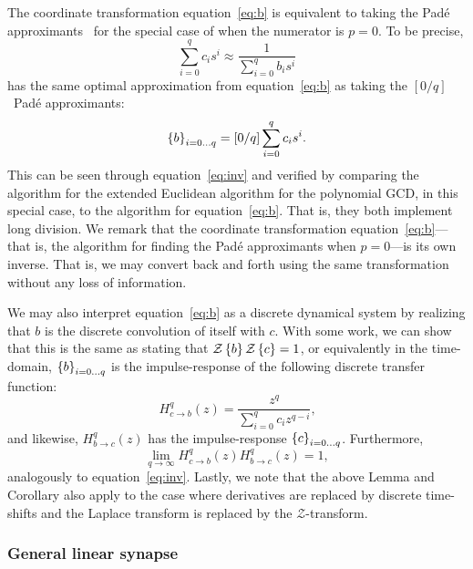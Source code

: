 The coordinate transformation equation~\ref{eq:b} is equivalent to taking the Pad\'e approximants~\citep{Pade1892} for the special case of when the numerator is $p = 0$.
To be precise,
$$
\sum_{i=0}^{q} c_i s^i \approx \frac{1}{\sum_{i=0}^q b_i s^i}
$$
has the same optimal approximation from equation~\ref{eq:b} as taking the $[0/q]$~Pad\'e approximants:
$$
\left\{ b \right\}_{i=0 \ldots q} = \left[ 0 / q \right] \sum_{i=0}^{q} c_i s^i \text{.}
$$
This can be seen through equation~\ref{eq:inv} and verified by comparing the algorithm for the extended Euclidean algorithm for the polynomial GCD, in this special case, to the algorithm for equation~\ref{eq:b}. That is, they both implement long division.
We remark that the coordinate transformation equation~\ref{eq:b}---that is, the algorithm for finding the Pad\'e approximants when $p = 0$---is its own inverse. That is, we may convert back and forth using the same transformation without any loss of information.

We may also interpret equation~\ref{eq:b} as a discrete dynamical system by realizing that $b$ is the discrete convolution of itself with $c$. With some work, we can show that this is the same as stating that $\mathcal{Z} \left\{ b \right\}\mathcal{Z} \left\{ c \right\} = 1$, or equivalently in the time-domain, $\left\{ b \right\}_{i=0\ldots q}$ is the impulse-response of the following discrete transfer function:
$$
H^q_{c \rightarrow b}(z) = \frac{z^{q}}{\sum_{i=0}^q c_i z^{q - i}} \text{,}
$$
and likewise, $H^q_{b \rightarrow c}(z)$ has the impulse-response $\left\{ c \right\}_{i=0\ldots q}$.
Furthermore, $$\lim_{q \rightarrow \infty} H^q_{c \rightarrow b}(z) H^q_{b \rightarrow c}(z) = 1,$$ analogously to equation~\ref{eq:inv}.
Lastly, we note that the above Lemma and Corollary also apply to the case where derivatives are replaced by discrete time-shifts and the Laplace transform is replaced by the $\mathcal{Z}$-transform.

\subsubsection{General linear synapse}

